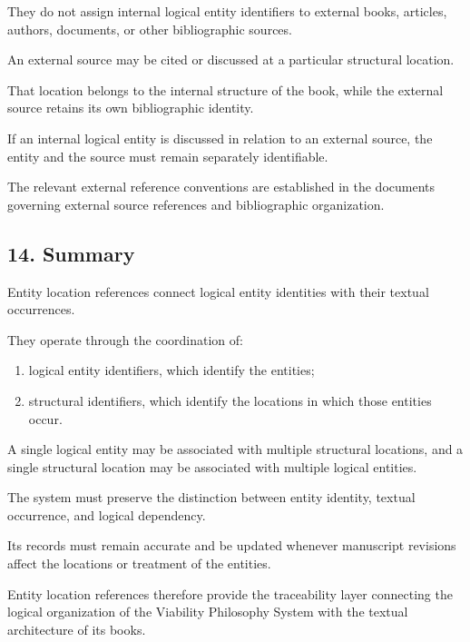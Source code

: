 They do not assign internal
logical entity identifiers
to external books, articles,
authors, documents, or
other bibliographic sources.

An external source may
be cited or discussed
at a particular structural
location.

That location belongs
to the internal structure
of the book, while the
external source retains
its own bibliographic
identity.

If an internal logical
entity is discussed in
relation to an external
source, the entity and
the source must remain
separately identifiable.

The relevant external
reference conventions
are established in the
documents governing
external source references
and bibliographic organization.


\subsection*{14. Summary}

Entity location references
connect logical entity
identities with their
textual occurrences.

They operate through
the coordination of:

\begin{enumerate}
    \item logical entity
    identifiers, which
    identify the entities;

    \item structural
    identifiers, which
    identify the locations
    in which those entities
    occur.
\end{enumerate}

A single logical entity
may be associated with
multiple structural
locations, and a single
structural location may
be associated with
multiple logical entities.

The system must preserve
the distinction between
entity identity, textual
occurrence, and logical
dependency.

Its records must remain
accurate and be updated
whenever manuscript
revisions affect the
locations or treatment
of the entities.

Entity location references
therefore provide the
traceability layer connecting
the logical organization
of the Viability Philosophy
System with the textual
architecture of its books.

\cleardoublepage

